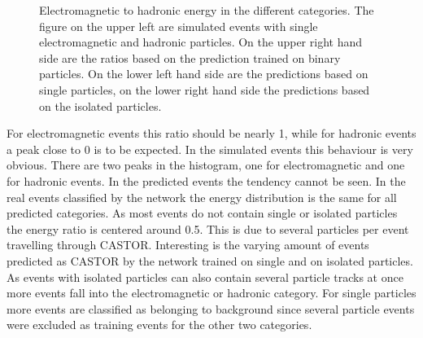 \begin{figure}
\begin{minipage}{0.45\textwidth}
\end{minipage}
\caption{Electromagnetic to hadronic energy in the different categories. The figure on the upper left are simulated events with single electromagnetic and hadronic particles. On the upper right hand side are the ratios based on the prediction trained on binary particles. On the lower left hand side are the predictions based on single particles, on the lower right hand side the predictions based on the isolated particles.}
\label{ratio}
\end{figure}

For electromagnetic events this ratio should be nearly 1, while for hadronic events a peak close to 0 is to be expected. In the simulated events this behaviour is very obvious. There are two peaks in the histogram, one for electromagnetic and one for hadronic events. In the predicted events the tendency cannot be seen. In the real events classified by the network the energy distribution is the same for all predicted categories. As most events do not contain single or isolated particles the energy ratio is centered around 0.5. This is due to several particles per event travelling through CASTOR. Interesting is the varying amount of events predicted as CASTOR by the network trained on single and on isolated particles. As events with isolated particles can also contain several particle tracks at once more events fall into the electromagnetic or hadronic category. For single particles more events are classified as belonging to background since several particle events were excluded as training events for the other two categories.
 
